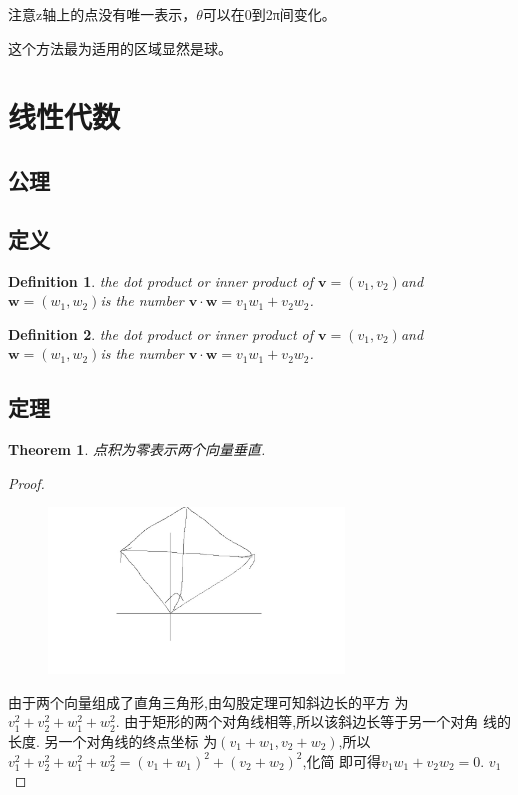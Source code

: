 \documentclass[UTF-8]{ctexart}
\newtheorem{definition}{Definition}[section]
\newtheorem{theorem}{Theorem}[section]
\newtheorem{proof}{Proof}[section]
\begin{document}
注意z轴上的点没有唯一表示，$\theta$可以在0到2π间变化。

这个方法最为适用的区域显然是球。



\section{线性代数}

\subsection{公理}
\subsection{定义}
\begin{definition}
  the dot product or inner product of $\mathbf{v}
=(v_1,v_2)$and$\mathbf{w}=(w_1,w_2)$is the number $\mathbf{v} \cdot \mathbf{w} = v_1w_1+v_2w_2$.

\end{definition}
\begin{definition}
  the dot product or inner product of $\mathbf{v}
=(v_1,v_2)$and$\mathbf{w}=(w_1,w_2)$is the number $\mathbf{v} \cdot \mathbf{w} = v_1w_1+v_2w_2$.

\end{definition}


\subsection{定理}
\begin{theorem}
  点积为零表示两个向量垂直.

\end{theorem}


\begin{proof}
  \begin{figure}[H] %
    \centering %
    \includegraphics[width=0.7\textwidth]{images/math/1.jpg} %
  \end{figure}
  由于两个向量组成了直角三角形,由勾股定理可知斜边长的平方
  为$v_1^2+v_2^2+w_1^2+w_2^2$. 由于矩形的两个对角线相等,所以该斜边长等于另一个对角
  线的长度. 另一个对角线的终点坐标
  为$(v_1+w_1,v_2+w_2)$,所以$v_1^2+v_2^2+w_1^2+w_2^2=(v_1+w_1)^2+(v_2+w_2)^2$,化简
  即可得$v_1w_1+v_2w_2=0$. $v_1$	
\end{proof}
\end{document}
